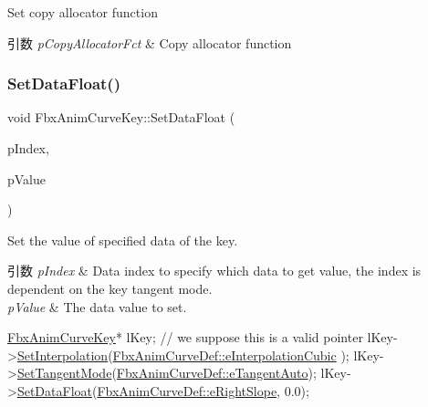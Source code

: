 Set copy allocator function 
\begin{DoxyParams}{引数}
{\em p\+Copy\+Allocator\+Fct} & Copy allocator function \\
\hline
\end{DoxyParams}
\mbox{\label{class_fbx_anim_curve_key_ad61a4843c52e4ba3a21102c577950dc5}} 
\subsubsection{\texorpdfstring{Set\+Data\+Float()}{SetDataFloat()}}
{\footnotesize\ttfamily void Fbx\+Anim\+Curve\+Key\+::\+Set\+Data\+Float (\begin{DoxyParamCaption}\item[{\hyperlink{class_fbx_anim_curve_def_a3be261d961f8226235529b148cf80300}{Fbx\+Anim\+Curve\+Def\+::\+E\+Data\+Index}}]{p\+Index,  }\item[{float}]{p\+Value }\end{DoxyParamCaption})\hspace{0.3cm}{\ttfamily [inline]}}

Set the value of specified data of the key. 
\begin{DoxyParams}{引数}
{\em p\+Index} & Data index to specify which data to get value, the index is dependent on the key tangent mode. \\
\hline
{\em p\+Value} & The data value to set.\\
\hline
\end{DoxyParams}

\begin{DoxyCode}
\hyperlink{class_fbx_anim_curve_key}{FbxAnimCurveKey}* lKey; \textcolor{comment}{// we suppose this is a valid pointer}
lKey->\hyperlink{class_fbx_anim_curve_key_a10777e9392725191bd6ab1d425460406}{SetInterpolation}(\hyperlink{class_fbx_anim_curve_def_add2ab7d10d856ab0868cc9b143d59ea5a16ef50fcdbb8ae99246f06e12f9d3dae}{FbxAnimCurveDef::eInterpolationCubic}
      );
lKey->\hyperlink{class_fbx_anim_curve_key_a8a8a090694fc042e9b234e40918faf8e}{SetTangentMode}(\hyperlink{class_fbx_anim_curve_def_ac810ccc5ca0527704ab5175479964b87a56e3bad364851277281e94e81327dd25}{FbxAnimCurveDef::eTangentAuto});
lKey->\hyperlink{class_fbx_anim_curve_key_ad61a4843c52e4ba3a21102c577950dc5}{SetDataFloat}(\hyperlink{class_fbx_anim_curve_def_a3be261d961f8226235529b148cf80300a97c20bbd5b06a532773ffd8c88624ec2}{FbxAnimCurveDef::eRightSlope}, 0.0);
\end{DoxyCode}
 

